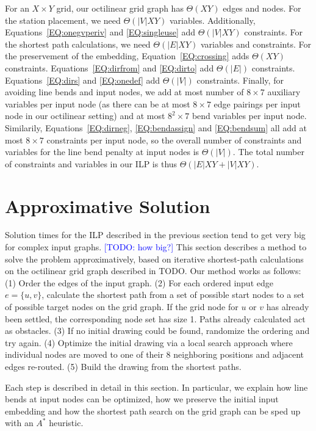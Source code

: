 \documentclass[sigconf]{acmart}
\newcommand\TODO[1]{\textcolor{blue}{\small [TODO: #1]}}
\begin{document}
For an $X \times Y$ grid, our octilinear grid graph has $\Theta(XY)$ edges and nodes.
For the station placement, we need ${\Theta}(|V|XY)$ variables.
Additionally, Equations~\ref{EQ:onegvperiv} and \ref{EQ:singleuse} add ${\Theta}(|V|XY)$ constraints.
For the shortest path calculations, we need ${\Theta}(|E|XY)$ variables and constraints.
For the preservement of the embedding, Equation~\ref{EQ:crossing} adds ${\Theta}(XY)$ constraints.
Equations~\ref{EQ:dirfrom} and \ref{EQ:dirto} add ${\Theta}(|E|)$ constraints.
Equations~\ref{EQ:dirs} and \ref{EQ:onedef} add ${\Theta}(|V|)$ constraints.
Finally, for avoiding line bends and input nodes, we add at most number of $8\times7$ auxiliary variables per input node (as there can be at most $8\times7$ edge pairings per input node in our octilinear setting) and at most $8^2\times7$ bend variables per input node.
Similarily, Equations~\ref{EQ:dirneg}, \ref{EQ:bendassign} and \ref{EQ:bendsum} all add at most $8\times7$ constraints per input node, so the overall number of constraints and variables for the line bend penalty at input nodes is ${\Theta}(|V|)$.
The total number of constraints and variables in our ILP is thus ${\Theta}(|E|XY + |V|XY)$.

\section{Approximative Solution}

Solution times for the ILP described in the previous section tend to get very big for complex input graphs. \TODO{how big?}
This section describes a method to solve the problem approximatively, based on iterative shortest-path calculations on the octilinear grid graph described in TODO.
Our method works as follows:
  (1) Order the edges of the input graph.
  (2) For each ordered input edge $e = \{u, v\}$, calculate the shortest path from a set of possible start nodes to a set of possible target nodes on the grid graph. If the grid node for $u$ or $v$ has already been settled, the corresponding node set has size 1. Paths already calculated act as obstacles.
  (3) If no initial drawing could be found, randomize the ordering and try again.
  (4) Optimize the initial drawing via a local search approach where individual nodes are moved to one of their 8 neighboring positions and adjacent edges re-routed.
  (5) Build the drawing from the shortest paths.

Each step is described in detail in this section.
In particular, we explain how line bends at input nodes can be optimized, how we preserve the initial input embedding and how the shortest path search on the grid graph can be sped up with an $A^*$ heuristic.
\end{document}

